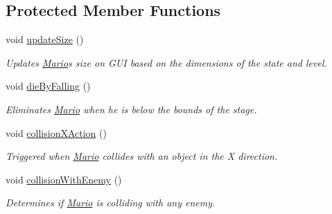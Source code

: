 \subsection*{Protected Member Functions}
\begin{DoxyCompactItemize}
\item 
\mbox{\label{classnl_1_1arjanfrans_1_1mario_1_1model_1_1Mario_abc7f009333139289959b2f3f6d9519e0}} 
void \hyperlink{classnl_1_1arjanfrans_1_1mario_1_1model_1_1Mario_abc7f009333139289959b2f3f6d9519e0}{update\+Size} ()
\begin{DoxyCompactList}\small\item\em Updates \hyperlink{classnl_1_1arjanfrans_1_1mario_1_1model_1_1Mario}{Mario}\textquotesingle{}s size on G\+UI based on the dimensions of the state and level. \end{DoxyCompactList}\item 
\mbox{\label{classnl_1_1arjanfrans_1_1mario_1_1model_1_1Mario_a02fb31ac344f015e0793f637d421e50d}} 
void \hyperlink{classnl_1_1arjanfrans_1_1mario_1_1model_1_1Mario_a02fb31ac344f015e0793f637d421e50d}{die\+By\+Falling} ()
\begin{DoxyCompactList}\small\item\em Eliminates \hyperlink{classnl_1_1arjanfrans_1_1mario_1_1model_1_1Mario}{Mario} when he is below the bounds of the stage. \end{DoxyCompactList}\item 
void \hyperlink{classnl_1_1arjanfrans_1_1mario_1_1model_1_1Mario_a8ec810c8c16e6f4151c1259fb96d1790}{collision\+X\+Action} ()
\begin{DoxyCompactList}\small\item\em Triggered when \hyperlink{classnl_1_1arjanfrans_1_1mario_1_1model_1_1Mario}{Mario} collides with an object in the X direction. \end{DoxyCompactList}\item 
void \hyperlink{classnl_1_1arjanfrans_1_1mario_1_1model_1_1Mario_a43d01eeb1d6b41506b86a806e7ec0f95}{collision\+With\+Enemy} ()
\begin{DoxyCompactList}\small\item\em Determines if \hyperlink{classnl_1_1arjanfrans_1_1mario_1_1model_1_1Mario}{Mario} is colliding with any enemy. \end{DoxyCompactList}\item 

\end{DoxyCompactItemize}
